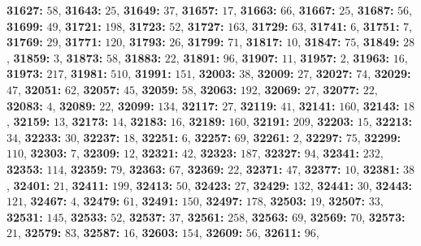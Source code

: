 \textsf{\bfseries 31627:} $58$, \textsf{\bfseries 31643:} $25$, \textsf{\bfseries 31649:} $37$, \textsf{\bfseries 31657:} $17$, \textsf{\bfseries 31663:} $66$, \textsf{\bfseries 31667:} $25$, \textsf{\bfseries 31687:} $56$, \textsf{\bfseries 31699:} $49$, \textsf{\bfseries 31721:} $198$, \textsf{\bfseries 31723:} $52$, \textsf{\bfseries 31727:} $163$, \textsf{\bfseries 31729:} $63$, \textsf{\bfseries 31741:} $6$, \textsf{\bfseries 31751:} $7$, \textsf{\bfseries 31769:} $29$, \textsf{\bfseries 31771:} $120$, \textsf{\bfseries 31793:} $26$, \textsf{\bfseries 31799:} $71$, \textsf{\bfseries 31817:} $10$, \textsf{\bfseries 31847:} $75$, \textsf{\bfseries 31849:} $28$, \textsf{\bfseries 31859:} $3$, \textsf{\bfseries 31873:} $58$, \textsf{\bfseries 31883:} $22$, \textsf{\bfseries 31891:} $96$, \textsf{\bfseries 31907:} $11$, \textsf{\bfseries 31957:} $2$, \textsf{\bfseries 31963:} $16$, \textsf{\bfseries 31973:} $217$, \textsf{\bfseries 31981:} $510$, \textsf{\bfseries 31991:} $151$, \textsf{\bfseries 32003:} $38$, \textsf{\bfseries 32009:} $27$, \textsf{\bfseries 32027:} $74$, \textsf{\bfseries 32029:} $47$, \textsf{\bfseries 32051:} $62$, \textsf{\bfseries 32057:} $45$, \textsf{\bfseries 32059:} $58$, \textsf{\bfseries 32063:} $192$, \textsf{\bfseries 32069:} $27$, \textsf{\bfseries 32077:} $22$, \textsf{\bfseries 32083:} $4$, \textsf{\bfseries 32089:} $22$, \textsf{\bfseries 32099:} $134$, \textsf{\bfseries 32117:} $27$, \textsf{\bfseries 32119:} $41$, \textsf{\bfseries 32141:} $160$, \textsf{\bfseries 32143:} $18$, \textsf{\bfseries 32159:} $13$, \textsf{\bfseries 32173:} $14$, \textsf{\bfseries 32183:} $16$, \textsf{\bfseries 32189:} $160$, \textsf{\bfseries 32191:} $209$, \textsf{\bfseries 32203:} $15$, \textsf{\bfseries 32213:} $34$, \textsf{\bfseries 32233:} $30$, \textsf{\bfseries 32237:} $18$, \textsf{\bfseries 32251:} $6$, \textsf{\bfseries 32257:} $69$, \textsf{\bfseries 32261:} $2$, \textsf{\bfseries 32297:} $75$, \textsf{\bfseries 32299:} $110$, \textsf{\bfseries 32303:} $7$, \textsf{\bfseries 32309:} $12$, \textsf{\bfseries 32321:} $42$, \textsf{\bfseries 32323:} $187$, \textsf{\bfseries 32327:} $94$, \textsf{\bfseries 32341:} $232$, \textsf{\bfseries 32353:} $114$, \textsf{\bfseries 32359:} $79$, \textsf{\bfseries 32363:} $67$, \textsf{\bfseries 32369:} $22$, \textsf{\bfseries 32371:} $47$, \textsf{\bfseries 32377:} $10$, \textsf{\bfseries 32381:} $38$, \textsf{\bfseries 32401:} $21$, \textsf{\bfseries 32411:} $199$, \textsf{\bfseries 32413:} $50$, \textsf{\bfseries 32423:} $27$, \textsf{\bfseries 32429:} $132$, \textsf{\bfseries 32441:} $30$, \textsf{\bfseries 32443:} $121$, \textsf{\bfseries 32467:} $4$, \textsf{\bfseries 32479:} $61$, \textsf{\bfseries 32491:} $150$, \textsf{\bfseries 32497:} $178$, \textsf{\bfseries 32503:} $19$, \textsf{\bfseries 32507:} $33$, \textsf{\bfseries 32531:} $145$, \textsf{\bfseries 32533:} $52$, \textsf{\bfseries 32537:} $37$, \textsf{\bfseries 32561:} $258$, \textsf{\bfseries 32563:} $69$, \textsf{\bfseries 32569:} $70$, \textsf{\bfseries 32573:} $21$, \textsf{\bfseries 32579:} $83$, \textsf{\bfseries 32587:} $16$, \textsf{\bfseries 32603:} $154$, \textsf{\bfseries 32609:} $56$, \textsf{\bfseries 32611:} $96$, 
